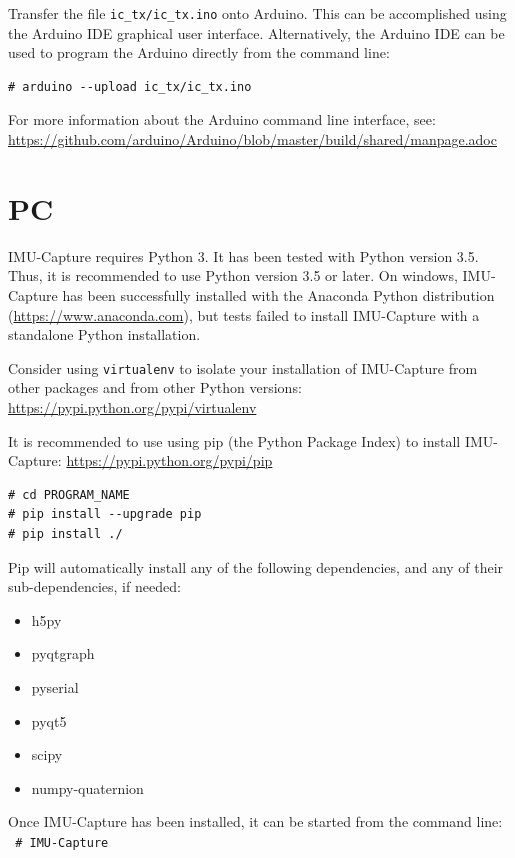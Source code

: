 \documentclass[11pt,letterpaper,article,oneside]{memoir}
\newcommand{\name}{IMU-Capture}
\begin{document}
Transfer the file \verb|ic_tx/ic_tx.ino| onto Arduino.  This can be accomplished
using the Arduino IDE graphical user interface.  Alternatively, the Arduino IDE
can be used to program the Arduino directly from the command line:

\begin{verbatim}
# arduino --upload ic_tx/ic_tx.ino
\end{verbatim}

For more information about the Arduino command line interface, see:
\url{https://github.com/arduino/Arduino/blob/master/build/shared/manpage.adoc}


\section{PC}
\label{sec:installPc}

\name{} requires Python 3. It has been tested with Python version 3.5. Thus, it
is recommended to use Python version 3.5 or later. On windows, \name{} has been
successfully installed with the Anaconda Python distribution
(\url{https://www.anaconda.com}), but tests failed to install \name{} with a
standalone Python installation.

Consider using \texttt{virtualenv} to isolate your installation of \name{} from
other packages and from other Python versions:
\url{https://pypi.python.org/pypi/virtualenv}

It is recommended to use using pip (the Python Package Index) to install
\name{}: \url{https://pypi.python.org/pypi/pip}

\begin{verbatim}
# cd PROGRAM_NAME
# pip install --upgrade pip
# pip install ./
\end{verbatim}

Pip will automatically install any of the following dependencies, and any of their sub-dependencies, if needed:
\begin{itemize}
\item h5py
\item pyqtgraph
\item pyserial
\item pyqt5
\item scipy
\item numpy-quaternion
\end{itemize}

Once \name{} has been installed, it can be started from the command line:\\

\texttt{
\# \name{}
}
\end{document}

